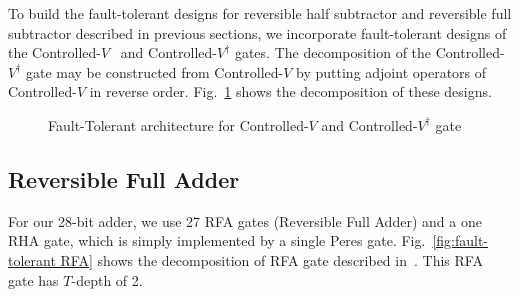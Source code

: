 \documentclass[%
reprint,
 amsmath,amssymb,
 aps,
]{revtex4-1}
\begin{document}
To build the fault-tolerant designs for reversible half subtractor and reversible full subtractor described in previous sections, we incorporate fault-tolerant designs of the Controlled-$V$~\cite{fast-synthesis} and Controlled-$V^\dag$ gates. The decomposition of the Controlled-$V^\dag$ gate may be constructed from Controlled-$V$ by putting adjoint operators of Controlled-$V$ in reverse order. Fig.~\ref{fig:fault-tolerant controlled-V} shows the decomposition of these designs.

\begin{figure}[h]

\centering
{}



\caption{Fault-Tolerant architecture for Controlled-$V$ and Controlled-$V^\dag$ gate}
\label{fig:fault-tolerant controlled-V}
\end{figure}  

\subsection{Reversible Full Adder}

For our 28-bit adder, we use 27 RFA gates (Reversible Full Adder) and a one RHA gate, which is simply implemented by a single Peres gate. Fig.~\ref{fig:fault-tolerant RFA} shows the decomposition of RFA gate described in~\cite{fast-synthesis}. This RFA gate has $T$-depth of 2.
\end{document}
